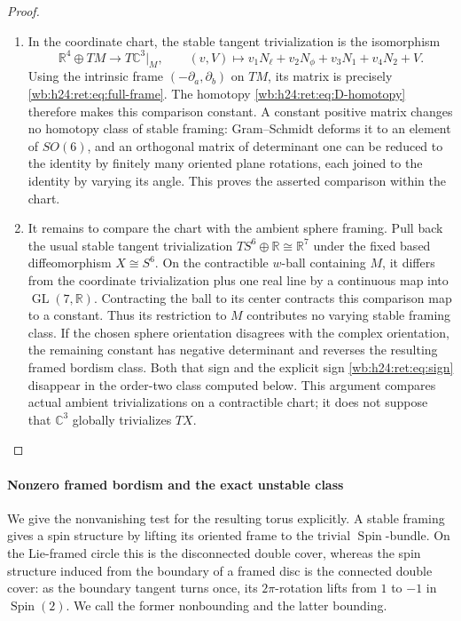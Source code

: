 \begin{proof}
\begin{enumerate}[label=\arabic*.,leftmargin=*]
\item In the coordinate chart, the stable tangent trivialization is the
isomorphism
\[
 \mathbb R^4\oplus TM\longrightarrow T\mathbb C^3|_M,
 \qquad (v,V)\longmapsto
 v_1N_\ell+v_2N_\phi+v_3N_1+v_4N_2+V.
\]
Using the intrinsic frame \((-\partial_a,\partial_b)\) on \(TM\),
its matrix is precisely \eqref{wb:h24:ret:eq:full-frame}.  The homotopy
\eqref{wb:h24:ret:eq:D-homotopy} therefore makes this comparison constant.
A constant positive matrix changes no homotopy class of stable
framing: Gram--Schmidt deforms it to an element of \(SO(6)\), and
an orthogonal matrix of determinant one can be reduced to the identity
by finitely many oriented plane rotations, each joined to the
identity by varying its angle.  This proves the asserted comparison
within the chart.

\item It remains to compare the chart with the ambient sphere framing.
Pull back the usual stable tangent trivialization
\(TS^6\oplus\mathbb R\cong\mathbb R^7\) under the fixed based diffeomorphism
\(X\cong S^6\).  On the contractible \(w\)-ball containing \(M\),
it differs from the coordinate trivialization plus one real line by
a continuous map into \(\operatorname{GL}(7,\mathbb R)\).  Contracting the ball to its
center contracts this comparison map to a constant.  Thus its
restriction to \(M\) contributes no varying stable framing class.
If the chosen sphere orientation disagrees with the complex
orientation, the remaining constant has negative determinant and
reverses the resulting framed bordism class.  Both that sign and the
explicit sign \eqref{wb:h24:ret:eq:sign} disappear in the order-two class
computed below.  This argument compares actual ambient
trivializations on a contractible chart; it does not suppose that
\(\mathbb C^3\) globally trivializes \(TX\).
\end{enumerate}
\end{proof}

\paragraph{Nonzero framed bordism and the exact unstable class}

We give the nonvanishing test for the resulting torus explicitly.
A stable framing gives a spin structure by lifting its oriented frame
to the trivial \(\operatorname{Spin}\)-bundle.  On the Lie-framed
circle this is the disconnected double cover, whereas the spin
structure induced from the boundary of a framed disc is the
connected double cover: as the boundary tangent turns once, its
\(2\pi\)-rotation lifts from \(1\) to \(-1\) in
\(\operatorname{Spin}(2)\).  We call the former nonbounding and the
latter bounding.

